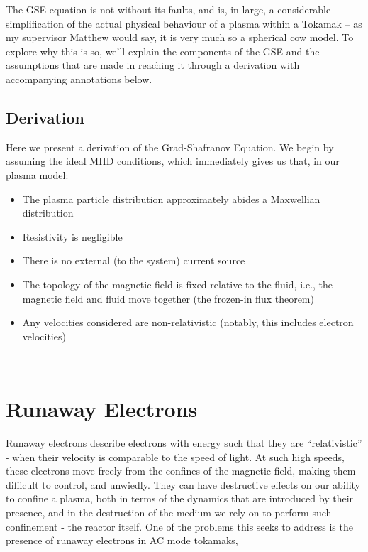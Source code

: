 The GSE equation is not without its faults, and is, in large, a considerable simplification of the actual physical behaviour 
of a plasma within a Tokamak -- as my supervisor Matthew would say, it is very much so a spherical cow model. To explore 
why this is so, we'll explain the components of the GSE and the assumptions that are made in reaching it through a 
derivation with accompanying annotations below.

\subsection{Derivation}

Here we present a derivation of the Grad-Shafranov Equation. We begin by assuming the ideal MHD conditions, which 
immediately gives us that, in our plasma model:
\begin{itemize}
    \item The plasma particle distribution approximately abides a Maxwellian distribution
    \item Resistivity is negligible
    \item There is no external (to the system) current source
    \item The topology of the magnetic field is fixed relative to the fluid, i.e., the magnetic field and fluid move together (the frozen-in flux theorem)
    \item Any velocities considered are non-relativistic (notably, this includes electron velocities)
\end{itemize}

\TODO \\

\section{Runaway Electrons}

Runaway electrons describe electrons with energy such that they are ``relativistic'' - when their velocity 
is comparable to the speed of light. At such high speeds, these electrons move freely from the confines of the 
magnetic field, making them difficult to control, and unwiedly. They can have destructive effects on our ability to confine 
a plasma, both in terms of the dynamics that are introduced by their presence, and in the destruction of the medium we rely 
on to perform such confinement - the reactor itself. One of the problems this seeks to address is the presence of runaway electrons 
in AC mode tokamaks, 

